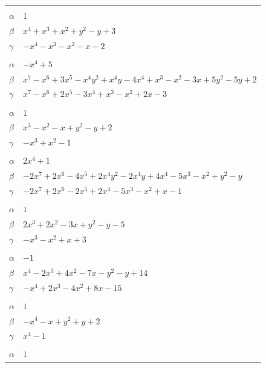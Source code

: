 \documentclass[11pt]{article}
\begin{document}
\begin{longtable}{@{}ll@{}}
\addlinespace[3pt]
\multicolumn{2}{@{}l}{$\{i,j\}=\{4,16\}$, $k_{ij}=5$}\\
$\alpha$ & $1$\\
$\beta$ & $x^{4}+x^{3}+x^{2}+y^{2}-y+3$\\
$\gamma$ & $-x^{4}-x^{3}-x^{2}-x-2$\\
\addlinespace[3pt]
\multicolumn{2}{@{}l}{$\{i,j\}=\{4,22\}$, $k_{ij}=2\cdot 3^{2}$}\\
$\alpha$ & $-x^{4}+5$\\
$\beta$ & $x^{7}-x^{6}+3x^{5}-x^{4}y^{2}+x^{4}y-4x^{4}+x^{3}-x^{2}-3x+5y^{2}-5y+2$\\
$\gamma$ & $x^{7}-x^{6}+2x^{5}-3x^{4}+x^{3}-x^{2}+2x-3$\\
\addlinespace[3pt]
\multicolumn{2}{@{}l}{$\{i,j\}=\{4,24\}$, $k_{ij}=2$}\\
$\alpha$ & $1$\\
$\beta$ & $x^{3}-x^{2}-x+y^{2}-y+2$\\
$\gamma$ & $-x^{3}+x^{2}-1$\\
\addlinespace[3pt]
\multicolumn{2}{@{}l}{$\{i,j\}=\{4,28\}$, $k_{ij}=3$}\\
$\alpha$ & $2x^{4}+1$\\
$\beta$ & $-2x^{7}+2x^{6}-4x^{5}+2x^{4}y^{2}-2x^{4}y+4x^{4}-5x^{3}-x^{2}+y^{2}-y$\\
$\gamma$ & $-2x^{7}+2x^{6}-2x^{5}+2x^{4}-5x^{3}-x^{2}+x-1$\\
\addlinespace[3pt]
\multicolumn{2}{@{}l}{$\{i,j\}=\{4,33\}$, $k_{ij}=3^{2}$}\\
$\alpha$ & $1$\\
$\beta$ & $2x^{3}+2x^{2}-3x+y^{2}-y-5$\\
$\gamma$ & $-x^{3}-x^{2}+x+3$\\
\addlinespace[3pt]
\multicolumn{2}{@{}l}{$\{i,j\}=\{5,8\}$, $k_{ij}=5^{2}$}\\
$\alpha$ & $-1$\\
$\beta$ & $x^{4}-2x^{3}+4x^{2}-7x-y^{2}-y+14$\\
$\gamma$ & $-x^{4}+2x^{3}-4x^{2}+8x-15$\\
\addlinespace[3pt]
\multicolumn{2}{@{}l}{$\{i,j\}=\{5,9\}$, $k_{ij}=5$}\\
$\alpha$ & $1$\\
$\beta$ & $-x^{4}-x+y^{2}+y+2$\\
$\gamma$ & $x^{4}-1$\\
\addlinespace[3pt]
\multicolumn{2}{@{}l}{$\{i,j\}=\{5,16\}$, $k_{ij}=5\cdot 7^{2}$}\\
$\alpha$ & $1$\\

\end{longtable}
\end{document}
